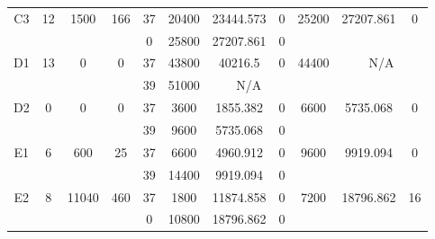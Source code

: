 \begin{sidewaystable}
\begin{tabular}{c||c|c|c||c|c|c|c||c|c|c}
         &
        
      \\
      \hline
      \multirow{2}{*}{C3} &
      \multirow{2}{*}{12} &
      \multirow{2}{*}{1500} &
      \multirow{2}{*}{166} &
      37 &
      20400 &
        23444.573 &
        0 &
      \multirow{2}{*}{25200} &
        \multirow{2}{*}{27207.861} &
        \multirow{2}{*}{0}
      \\
      \cline{5-8}
       &
       &
       &
       &
      0 &
      25800 &
        27207.861 &
        0 &
      
         &
        
      \\
      \hline
      \multirow{2}{*}{D1} &
      \multirow{2}{*}{13} &
      \multirow{2}{*}{0} &
      \multirow{2}{*}{0} &
      37 &
      43800 &
        40216.5 &
        0 &
      \multirow{2}{*}{44400} &
        \multicolumn{2}{c}{\multirow{2}{*}{N/A}}
      \\
      \cline{5-8}
       &
       &
       &
       &
      39 &
      51000 &
        \multicolumn{2}{|c||}{N/A} &
      
        
      \\
      \hline
      \multirow{2}{*}{D2} &
      \multirow{2}{*}{0} &
      \multirow{2}{*}{0} &
      \multirow{2}{*}{0} &
      37 &
      3600 &
        1855.382 &
        0 &
      \multirow{2}{*}{6600} &
        \multirow{2}{*}{5735.068} &
        \multirow{2}{*}{0}
      \\
      \cline{5-8}
       &
       &
       &
       &
      39 &
      9600 &
        5735.068 &
        0 &
      
         &
        
      \\
      \hline
      \multirow{2}{*}{E1} &
      \multirow{2}{*}{6} &
      \multirow{2}{*}{600} &
      \multirow{2}{*}{25} &
      37 &
      6600 &
        4960.912 &
        0 &
      \multirow{2}{*}{9600} &
        \multirow{2}{*}{9919.094} &
        \multirow{2}{*}{0}
      \\
      \cline{5-8}
       &
       &
       &
       &
      39 &
      14400 &
        9919.094 &
        0 &
      
         &
        
      \\
      \hline
      \multirow{2}{*}{E2} &
      \multirow{2}{*}{8} &
      \multirow{2}{*}{11040} &
      \multirow{2}{*}{460} &
      37 &
      1800 &
        11874.858 &
        0 &
      \multirow{2}{*}{7200} &
        \multirow{2}{*}{18796.862} &
        \multirow{2}{*}{16}
      \\
      \cline{5-8}
       &
       &
       &
       &
      0 &
      10800 &
        18796.862 &
        0 &
      

\end{tabular}
\end{sidewaystable}

